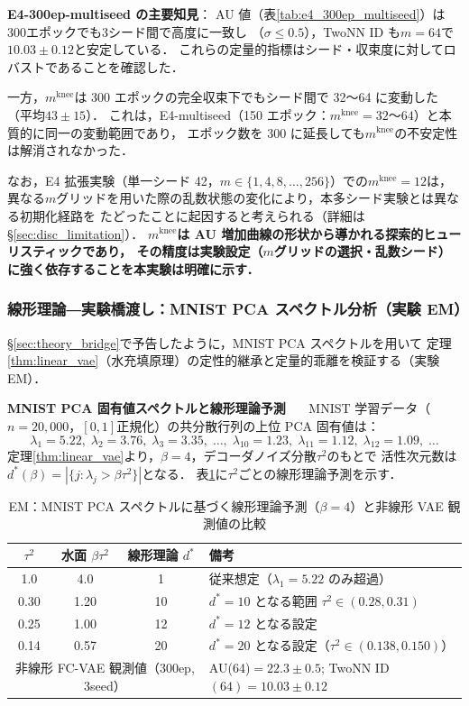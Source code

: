 \documentclass[11pt,a4paper]{jsarticle}
\newcommand{\mknee}{m^{\mathrm{knee}}}
\begin{document}
\textbf{E4-300ep-multiseed の主要知見}：
AU 値（表\ref{tab:e4_300ep_multiseed}）は300エポックでも3シード間で高度に一致し
（$\sigma \leq 0.5$），TwoNN ID も$m = 64$で$10.03 \pm 0.12$と安定している．
これらの定量的指標はシード・収束度に対してロバストであることを確認した．

一方，$\mknee$は 300 エポックの完全収束下でもシード間で 32〜64 に変動した
（平均$43 \pm 15$）．
これは，E4-multiseed（150 エポック：$\mknee = 32$〜$64$）と本質的に同一の変動範囲であり，
エポック数を 300 に延長しても$\mknee$の不安定性は解消されなかった．

なお，E4 拡張実験（単一シード 42，$m \in \{1, 4, 8, \ldots, 256\}$）での$\mknee = 12$は，
異なる$m$グリッドを用いた際の乱数状態の変化により，本多シード実験とは異なる初期化経路を
たどったことに起因すると考えられる（詳細は§\ref{sec:disc_limitation}）．
\textbf{$\mknee$は AU 増加曲線の形状から導かれる探索的ヒューリスティックであり，
その精度は実験設定（$m$グリッドの選択・乱数シード）に強く依存することを本実験は明確に示す．}

\subsubsection{線形理論―実験橋渡し：MNIST PCA スペクトル分析（実験 EM）}\label{sec:exp_em}

§\ref{sec:theory_bridge}で予告したように，MNIST PCA スペクトルを用いて
定理\ref{thm:linear_vae}（水充填原理）の定性的継承と定量的乖離を検証する（実験 EM）．

\textbf{MNIST PCA 固有値スペクトルと線形理論予測}~~~
MNIST 学習データ（$n = 20{,}000$，$[0,1]$正規化）の共分散行列の上位 PCA 固有値は：
\[
\lambda_1=5.22,\; \lambda_2=3.76,\; \lambda_3=3.35,\;\ldots,\;
\lambda_{10}=1.23,\; \lambda_{11}=1.12,\; \lambda_{12}=1.09,\;\ldots
\]
定理\ref{thm:linear_vae}より，$\beta=4$，デコーダノイズ分散$\tau^2$のもとで
活性次元数は$d^*(\beta) = |\{j : \lambda_j > \beta\tau^2\}|$となる．
表\ref{tab:theory_pred}に$\tau^2$ごとの線形理論予測を示す．

\begin{table}[H]
\centering
\caption{EM：MNIST PCA スペクトルに基づく線形理論予測（$\beta=4$）と非線形 VAE 観測値の比較}
\label{tab:theory_pred}
\small
\begin{tabular}{ccc|l}
\toprule
$\tau^2$ & 水面 $\beta\tau^2$ & 線形理論 $d^*$ & 備考 \\
\midrule
1.0  & 4.0  & 1   & 従来想定（$\lambda_1=5.22$ のみ超過）\\
0.30 & 1.20 & 10  & $d^* = 10$ となる範囲 $\tau^2 \in (0.28, 0.31)$ \\
0.25 & 1.00 & 12  & $d^* = 12$ となる設定 \\
0.14 & 0.57 & 20  & $d^* = 20$ となる設定（$\tau^2 \in (0.138, 0.150)$） \\
\midrule
\multicolumn{3}{c|}{非線形 FC-VAE 観測値（300ep, 3seed）} & AU(64)$=22.3\pm0.5$; TwoNN ID$(64)=10.03\pm0.12$ \\
\bottomrule
\end{tabular}
\end{table}
\end{document}
